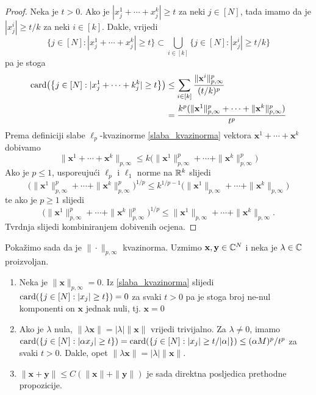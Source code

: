 \documentclass[a4paper,twoside,12pt]{memoir} %
\newcommand{\vect}[1]{\mathbf{#1}}
\renewcommand{\vec}{\vect}
\newcommand{\card}{\text{\normalfont{card}}}
\newcommand{\norm}[1]{\|{#1}\|}
\begin{document}
\begin{proof}
    Neka je $t>0$. Ako je $|x_j^1+\cdots+x_j^k|\geq t$ za neki $j\in [N]$, tada imamo da je $|x_j^i|\geq t/k$ za neki $i \in [k]$. Dakle, vrijedi
    \begin{equation*}
        \big\{ j\in [N]:|x_j^1+\cdots+x_j^k| \geq t \big\} \subset \bigcup\limits_{i\in [k]} \big \{ j \in [N] : |x_j^i| \geq t/k \big \}
    \end{equation*}
    pa je stoga
    \begin{align*}
        \card\big( \big\{ j\in [N] : |x_j^1+\cdots+k_j^k| \geq t \big\}\big)&\leq\sum\limits_{i\in [k]}\frac{\|\vec{x}^i\|^p_{p, \infty}}{(t/k)^p} \\ 
                                                                            &= \frac{k^p(\|\vec{x}^1\|^p_{p, \infty}+\cdots + \|\vec{x}^k\|^p_{p, \infty})}{t^p}
    \end{align*}
    Prema definiciji slabe $\ell_p$-kvazinorme \eqref{slaba_kvazinorma} vektora $\vec{x}^1+\cdots+\vec{x}^k$ dobivamo
    \begin{equation*}
        \|\vec{x}^1+\cdots+\vec{x}^k\|_{p, \infty}\leq k\big(\|\vec{x}^1\|^p_{p,\infty}+ \cdots +\|\vec{x}^k\|^p_{p,\infty}\big) 
    \end{equation*}
    Ako je $p \leq 1$, uspore\dj uju\'ci $\ell_p$ i $\ell_1$ norme na $\mathbb{R}^k$ slijedi
    \begin{equation*}
        \big(\|\vec{x}^1\|^p_{p,\infty}+ \cdots +\|\vec{x}^k\|^p_{p,\infty}\big)^{1/p} \leq k^{1/p-1}\big(\|\vec{x}^1\|_{p,\infty}+ \cdots +\|\vec{x}^k\|_{p,\infty}\big)
    \end{equation*}
    te ako je $p \geq 1$ slijedi
    \begin{equation*}
        \big(\|\vec{x}^1\|^p_{p,\infty}+ \cdots +\|\vec{x}^k\|^p_{p,\infty}\big)^{1/p} \leq \|\vec{x}^1\|_{p,\infty}+ \cdots +\|\vec{x}^k\|_{p,\infty}.
    \end{equation*}
    Tvrdnja slijedi kombiniranjem dobivenih ocjena.
\end{proof}

\noindent
Poka\v{z}imo sada da je $\norm{\cdot}_{p, \infty}$ kvazinorma. Uzmimo $\vec{x}, \vec{y} \in \C^N$ i neka je $\lambda \in \mathbb{C}$ proizvoljan.

\begin{enumerate}
    \item Neka je $\|\vec{x}\|_{p, \infty}=0$. Iz \eqref{slaba_kvazinorma} slijedi $ \card(\{j \in [N]: |x_j| \geq t\}) = 0$ za svaki $t > 0$ pa je stoga broj ne-nul komponenti on $\vec{x}$ jednak nuli, tj. $\vec{x}=0$ 
    \item Ako je $\lambda$ nula, $\|\lambda \vec{x}\| = | \lambda | \| \vec{x} \|$ vrijedi trivijalno. Za $\lambda \neq 0$, imamo \\
        $\card(\{ j \in [N]: |\alpha x_j| \geq t \}) = \card(\{ j \in [N]: |x_j| \geq t/|\alpha| \})\leq (\alpha M)^p/t^p$ za svaki $t>0$. Dakle, opet $\|\lambda \vec{x}\| = | \lambda | \| \vec{x} \|$.
    \item $\|\vec{x}+\vec{y}\|\leq C(\|\vec{x}\|+\|\vec{y}\|)$ je sada direktna posljedica prethodne propozicije.
\end{enumerate}
\end{document}
